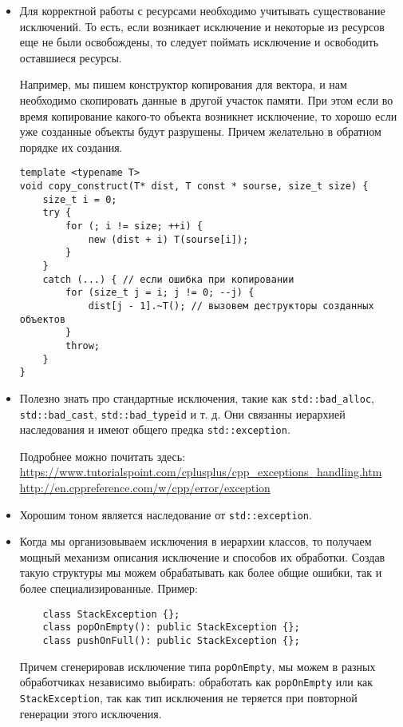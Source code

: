 \begin{itemize}
\item
Для корректной работы с ресурсами необходимо учитывать существование исключений. То есть, если возникает исключение и некоторые из ресурсов еще не были освобождены, то следует поймать исключение и освободить оставшиеся ресурсы.

Например, мы пишем конструктор копирования для вектора, и нам необходимо скопировать данные в другой участок памяти. При этом если во время копирование какого-то объекта возникнет исключение, то хорошо если уже созданные объекты будут разрушены. Причем желательно в обратном порядке их создания.
\begin{verbatim}
template <typename T>
void copy_construct(T* dist, T const * sourse, size_t size) {
    size_t i = 0;
    try {
        for (; i != size; ++i) {
            new (dist + i) T(sourse[i]);
        }
    }
    catch (...) { // если ошибка при копировании
        for (size_t j = i; j != 0; --j) {
            dist[j - 1].~T(); // вызовем деструкторы созданных объектов
        }
        throw;
    }
}
\end{verbatim}

\item
Полезно знать про стандартные исключения, такие как  \texttt{std::bad_alloc}, \texttt{std::bad_cast}, \texttt{std::bad_typeid} и т. д. Они связанны иерархией наследования и имеют общего предка \texttt{std::exception}.

Подробнее можно почитать здесь: \\
\url{https://www.tutorialspoint.com/cplusplus/cpp_exceptions_handling.htm} \\
\url{http://en.cppreference.com/w/cpp/error/exception} \\

\item
Хорошим тоном является наследование от \texttt{std::exception}.

\item
Когда мы организовываем исключения в иерархии классов, то получаем мощный механизм описания исключение и способов их обработки. Создав такую структуры мы можем обрабатывать как более общие ошибки, так и более специализированные.
Пример:
\begin{verbatim}
    class StackException {};
    class popOnEmpty(): public StackException {};
    class pushOnFull(): public StackException {};
\end{verbatim}
	Причем сгенерировав исключение типа \texttt{popOnEmpty}, мы можем в разных обработчиках независимо выбирать: обработать как \texttt{popOnEmpty} или как \texttt{StackException}, так как тип исключения не теряется при повторной генерации этого исключения.

\end{itemize}
